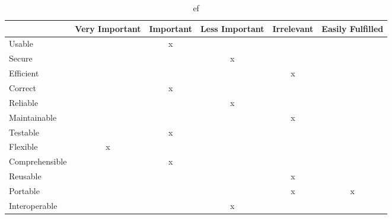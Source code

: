 \begin{table}[htbp]
	\centering
		\begin{tabular}{| l | m{} | m{}| m{}| m{}|m{}|} \hline
		  & Very  Important & Important & Less Important & Irrelevant & Easily Fulfilled \\ \hline
		Usable  & & \multicolumn{1}{c|}{x} & & & \\ \hline
		Secure  & & & \multicolumn{1}{c|}{x} & & \\ \hline
		Efficient & & & & \multicolumn{1}{c|}{x} & \\ \hline
		Correct  & & \multicolumn{1}{c|}{x} & & & \\ \hline
		Reliable  & & & \multicolumn{1}{c|}{x} & & \\ \hline
		Maintainable  & & & & \multicolumn{1}{c|}{x} & \\ \hline
		Testable  & & \multicolumn{1}{c|}{x} & & & \\ \hline
		Flexible  & \multicolumn{1}{c|}{x} & & & & \\ \hline
		Comprehensible  & & \multicolumn{1}{c|}{x} & & & \\ \hline
		Reusable  & & & & \multicolumn{1}{c|}{x} & \\ \hline
		Portable & & & & \multicolumn{1}{c|}{x} & \multicolumn{1}{c|}{x} \\ \hline
		Interoperable & & & \multicolumn{1}{c|}{x} & & \\ \hline
		\end{tabular}
	\caption{ef}
	\label{tab:ef}
\end{table}

